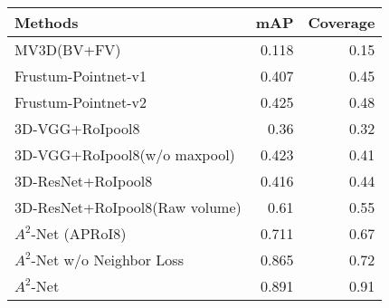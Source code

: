 \documentclass{article}
\begin{document}
\thispagestyle{empty}
\begin{table}[htbp]
    \small
      \begin{tabular}{lrr}
        \toprule
      Methods  & mAP & Coverage  \\
      \midrule
      MV3D(BV+FV)  & 0.118 & 0.15 \\
      Frustum-Pointnet-v1  & 0.407 & 0.45 \\
      Frustum-Pointnet-v2  & 0.425 & 0.48 \\
      3D-VGG+RoIpool8  & 0.36  & 0.32 \\
      3D-VGG+RoIpool8(w/o maxpool)  & 0.423 & 0.41 \\
      3D-ResNet+RoIpool8  & 0.416 & 0.44 \\
      3D-ResNet+RoIpool8(Raw volume)  & 0.61  & 0.55 \\
      $A^2$-Net (APRoI8)  & 0.711 & 0.67 \\
      $A^2$-Net w/o Neighbor Loss  & 0.865 & 0.72 \\
      $A^2$-Net  & 0.891 & 0.91 \\
      \bottomrule
      \end{tabular}%
    \end{table}%
\end{document}
